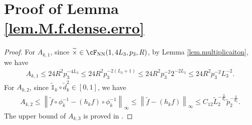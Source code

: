 \documentclass[11pt]{article} %
\begin{document}
\section{Proof of Lemma \ref{lem.M.f.dense.erro}}\label{lem.M.f.dense.erro.proof}
\begin{proof}
	For $A_{k,1}$, since $\widetilde{\times}\in \cF_{\rm NN}(1,4L_3,p_3,R)$, by Lemma \ref{lem.multiplicaiton}, we have
	\begin{align*}
		A_{k,1}\leq 24R^2p_3^{-4L_3}\leq 24R^2p_3^{-2\left(L_3+1\right)}\leq 24R^2p_3^{-2}2^{-2L_3}\leq 24R^2p_3^{-2}L_3^{-2}.
	\end{align*}
	For $A_{k,2}$, since $\widetilde{\mathds{1}}_k\circ \widetilde{d}_k^2\in [0,1]$, we have
	\begin{align*}
		A_{k,2}\leq \left\|\widetilde{f}\circ \phi_k^{-1}-(h_kf)\circ \phi_k^{-1}\right\|_{\infty}\leq \left\|\widetilde{f}-(h_kf)\right\|_{\infty} \leq C_{12}\widetilde{L}_2^{-\frac{2}{d_0}}\widetilde{p}_2^{-\frac{2}{d_0}}.
	\end{align*}
	The upper bound of $A_{k,3}$ is proved in \citep[Proof of Lemma 3]{chen2019nonparametric}.
\end{proof}
\end{document}
